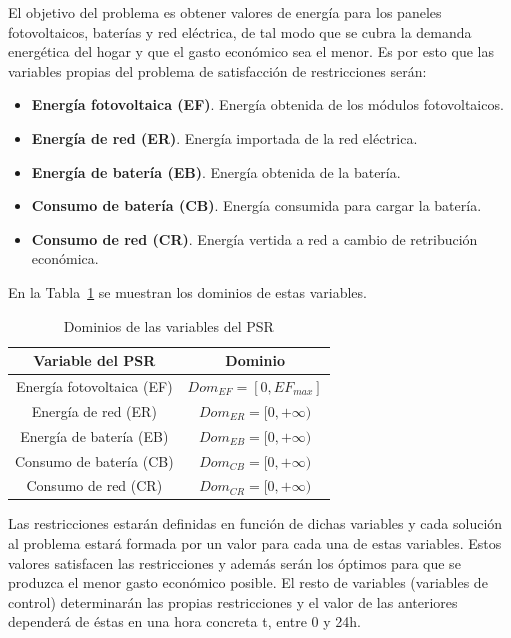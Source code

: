 El objetivo del problema es obtener valores de energía para los paneles fotovoltaicos, baterías y red eléctrica, de tal modo que se cubra la demanda energética del hogar y que el gasto económico sea el menor. Es por esto que las variables propias del problema de satisfacción de restricciones serán:
\begin{itemize}
\item \textbf{Energía fotovoltaica (EF)}. Energía obtenida de los módulos fotovoltaicos.
\item \textbf{Energía de red (ER)}. Energía importada de la red eléctrica.
\item \textbf{Energía de batería (EB)}. Energía obtenida de la batería.
\item \textbf{Consumo de batería (CB)}. Energía consumida para cargar la batería.
\item \textbf{Consumo de red (CR)}. Energía vertida a red a cambio de retribución económica.
\end{itemize}
En la Tabla~\ref{tab:domains} se muestran los dominios de estas variables.
\begin{table}[H]
        \centering
        \begin{tabular}{|c|c|}
        \hline
         \textbf{Variable del PSR} & \textbf{Dominio}\\ \hline
          Energía fotovoltaica (\gls{EF}) & $ Dom_{EF} = [0, EF_{max}] $ \\ \hline
          Energía de red (\gls{ER}) & $ Dom_{ER} = [0, +\infty) $\\ \hline
          Energía de batería (\gls{EB}) & $ Dom_{EB} = [0, +\infty) $\\ \hline
          Consumo de batería (\gls{CB}) & $ Dom_{CB} = [0, +\infty) $\\ \hline
          Consumo de red (\gls{CR}) & $ Dom_{CR} = [0, +\infty) $\\ \hline
        \end{tabular}
        \caption{Dominios de las variables del PSR}
        \label{tab:domains}
\end{table}

Las restricciones estarán definidas en función de dichas variables y cada solución al problema estará formada por un valor para cada una de estas variables. Estos valores satisfacen las restricciones y además serán los óptimos para que se produzca el menor gasto económico posible. El resto de variables (variables de control) determinarán las propias restricciones y el valor de las anteriores dependerá de éstas en una hora concreta t, entre 0 y 24h.\\

